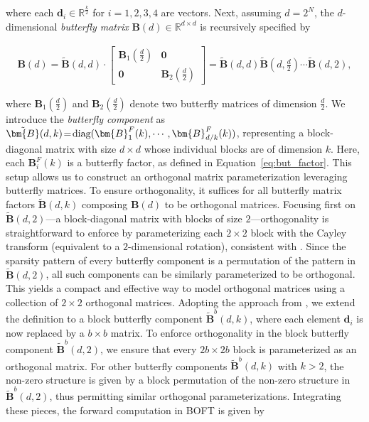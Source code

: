 where each $\bm{d}_i\in\mathbb{R}^{\frac{k}{2}}$ for $i = 1, 2, 3, 4$ are vectors. Next, assuming $d=2^N$, the $d$-dimensional \emph{butterfly matrix} $\bm{B}(d)\in\mathbb{R}^{d\times d}$ is recursively specified by

\begin{equation}
\begin{aligned}
    \!\!\bm{B}(d)=\tilde{\bm{B}}(d,d)\!\cdot\!\begin{bmatrix}
    \bm{B}_1(\frac{d}{2})\!\!\!\!\! & \bm{0} \\
    \bm{0}\!\!\!\!\! &\bm{B}_2(\frac{d}{2})
    \end{bmatrix}= \tilde{\bm{B}}(d,d)\tilde{\bm{B}}(d,\frac{d}{2})\cdots\tilde{\bm{B}}(d,2),
\end{aligned}
\end{equation}

where $\bm{B}_1(\frac{d}{2})$ and $\bm{B}_2(\frac{d}{2})$ denote two butterfly matrices of dimension $\frac{d}{2}$. We introduce the \emph{butterfly component} as $\thickmuskip=2mu \medmuskip=2mu \tilde{\bm{B}}(d,k)=\text{diag}(\bm{B}^F_1(k),\cdots,\bm{B}^F_{d/k}(k))$, representing a block-diagonal matrix with size $d\times d$ whose individual blocks are of dimension $k$. Here, each $\bm{B}^F_i(k)$ is a butterfly factor, as defined in Equation~\ref{eq:but_factor}. This setup allows us to construct an orthogonal matrix parameterization leveraging butterfly matrices. To ensure orthogonality, it suffices for all butterfly matrix factors $\tilde{\bm{B}}(d,k)$ composing $\bm{B}(d)$ to be orthogonal matrices. Focusing first on $\tilde{\bm{B}}(d,2)$—a block-diagonal matrix with blocks of size $2$—orthogonality is straightforward to enforce by parameterizing each $2\times 2$ block with the Cayley transform (equivalent to a $2$-dimensional rotation), consistent with \cite{liu2021orthogonal,qiu2023controlling}. Since the sparsity pattern of every butterfly component is a permutation of the pattern in $\tilde{\bm{B}}(d,2)$, all such components can be similarly parameterized to be orthogonal. This yields a compact and effective way to model orthogonal matrices using a collection of $2\times 2$ orthogonal matrices. Adopting the approach from \cite{chen2022pixelated}, we extend the definition to a block butterfly component $\tilde{\bm{B}}^b(d,k)$, where each element $\bm{d}_i$ is now replaced by a $b\times b$ matrix. To enforce orthogonality in the block butterfly component $\tilde{\bm{B}}^b(d,2)$, we ensure that every $2b\times 2b$ block is parameterized as an orthogonal matrix. For other butterfly components $\tilde{\bm{B}}^b(d,k)$ with $k>2$, the non-zero structure is given by a block permutation of the non-zero structure in $\tilde{\bm{B}}^b(d,2)$, thus permitting similar orthogonal parameterizations. Integrating these pieces, the forward computation in BOFT is given by

